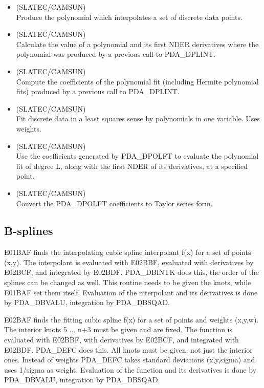 \begin{itemize}
\item {} (SLATEC/CAMSUN)\ \\
   Produce the polynomial which interpolates a set of discrete data
   points.
\item {} (SLATEC/CAMSUN)\ \\
   Calculate the value of a polynomial and its first NDER derivatives
   where the polynomial was produced by a previous call to PDA\_DPLINT.
\item {} (SLATEC/CAMSUN)\ \\
   Compute the coefficients of the polynomial fit (including Hermite
   polynomial fits) produced by a previous call to PDA\_DPLINT.

\item {} (SLATEC/CAMSUN)\ \\
   Fit discrete data in a least squares sense by polynomials in one
   variable. Uses weights.
\item {} (SLATEC/CAMSUN)\ \\
   Use the coefficients generated by PDA\_DPOLFT to evaluate the
   polynomial fit of degree L, along with the first NDER of its
   derivatives, at a specified point.
\item {} (SLATEC/CAMSUN)\ \\
   Convert the PDA\_DPOLFT coefficients to Taylor series form.

\end{itemize}


\subsection{B-splines}

   E01BAF finds the interpolating cubic spline interpolant f(x) for a
   set of points (x,y). The interpolant is evaluated with E02BBF,
   evaluated with
   derivatives by E02BCF, and integrated by E02BDF. PDA\_DBINTK
   does this, the order of the splines can be changed as well. This
   routine needs to be given the knots, while E01BAF set them itself.
   Evaluation of the interpolant and its derivatives is done by
   PDA\_DBVALU, integration by PDA\_DBSQAD.

   E02BAF finds the fitting cubic spline f(x) for a set of points and
   weights (x,y,w). The interior knots 5 ... n+3 must be given and are
   fixed. The function is evaluated with E02BBF, with derivatives by
   E02BCF, and integrated with E02BDF. PDA\_DEFC does this. All knots must be
   given, not just the interior ones.
   Instead of weights PDA\_DEFC takes standard deviations (x,y,sigma) and uses
   1/sigma as weight. Evaluation of the function and its derivatives is
   done by PDA\_DBVALU, integration by PDA\_DBSQAD. 

